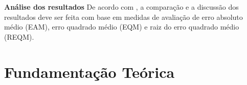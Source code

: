 \documentclass[	12pt, Times, openright, twoside, a4paper, english, brazil]{abntex2}
\begin{document}
        
        \textbf{Análise dos resultados}
        De acordo com \cite{Flavia2014}, a comparação e a discussão dos resultados deve ser feita com base em medidas de avaliação de erro absoluto médio (EAM), erro quadrado médio (EQM) e raiz do erro quadrado médio (REQM).
  \chapter{Fundamentação Teórica}


\end{document}
